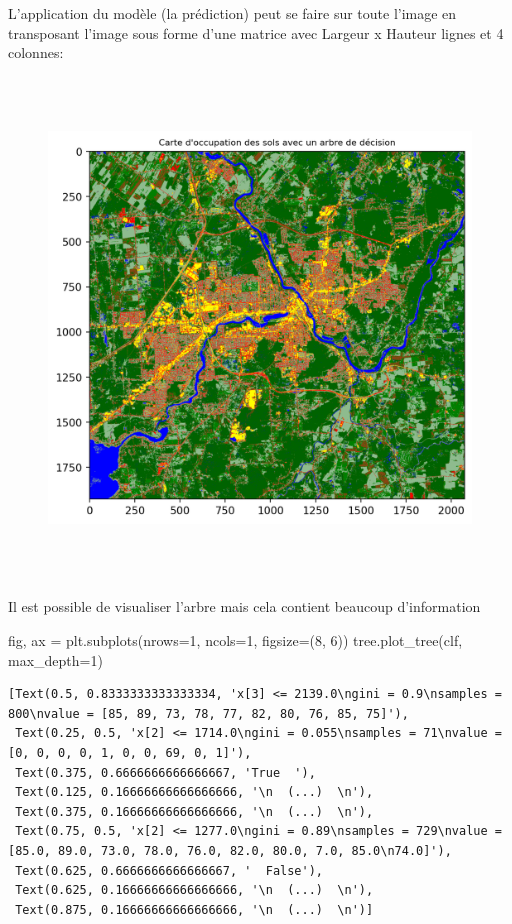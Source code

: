 \documentclass[
]{article}
\newenvironment{Shaded}{}{}
\newcommand{\DecValTok}[1]{\textcolor[rgb]{0.25,0.63,0.44}{#1}}
\newcommand{\NormalTok}[1]{#1}
\newcommand{\OperatorTok}[1]{\textcolor[rgb]{0.40,0.40,0.40}{#1}}
\begin{document}
L'application du modèle (la prédiction) peut se faire sur toute l'image
en transposant l'image sous forme d'une matrice avec Largeur x Hauteur
lignes et 4 colonnes:

\label{248842f3}
\begin{figure}
\centering
\includegraphics[width=5.625in,height=5.22917in]{05-ClassificationsSupervisees_files/figure-html/cell-39-output-1.png}
\caption{}
\end{figure}

Il est possible de visualiser l'arbre mais cela contient beaucoup
d'information

\label{3163f0dc}
\label{cb41}
\begin{Shaded}
\begin{Highlighting}[]
\NormalTok{fig, ax }\OperatorTok{=}\NormalTok{ plt.subplots(nrows}\OperatorTok{=}\DecValTok{1}\NormalTok{, ncols}\OperatorTok{=}\DecValTok{1}\NormalTok{, figsize}\OperatorTok{=}\NormalTok{(}\DecValTok{8}\NormalTok{, }\DecValTok{6}\NormalTok{))}
\NormalTok{tree.plot\_tree(clf, max\_depth}\OperatorTok{=}\DecValTok{1}\NormalTok{)}
\end{Highlighting}
\end{Shaded}

\begin{verbatim}
[Text(0.5, 0.8333333333333334, 'x[3] <= 2139.0\ngini = 0.9\nsamples = 800\nvalue = [85, 89, 73, 78, 77, 82, 80, 76, 85, 75]'),
 Text(0.25, 0.5, 'x[2] <= 1714.0\ngini = 0.055\nsamples = 71\nvalue = [0, 0, 0, 0, 1, 0, 0, 69, 0, 1]'),
 Text(0.375, 0.6666666666666667, 'True  '),
 Text(0.125, 0.16666666666666666, '\n  (...)  \n'),
 Text(0.375, 0.16666666666666666, '\n  (...)  \n'),
 Text(0.75, 0.5, 'x[2] <= 1277.0\ngini = 0.89\nsamples = 729\nvalue = [85.0, 89.0, 73.0, 78.0, 76.0, 82.0, 80.0, 7.0, 85.0\n74.0]'),
 Text(0.625, 0.6666666666666667, '  False'),
 Text(0.625, 0.16666666666666666, '\n  (...)  \n'),
 Text(0.875, 0.16666666666666666, '\n  (...)  \n')]
\end{verbatim}
\end{document}

